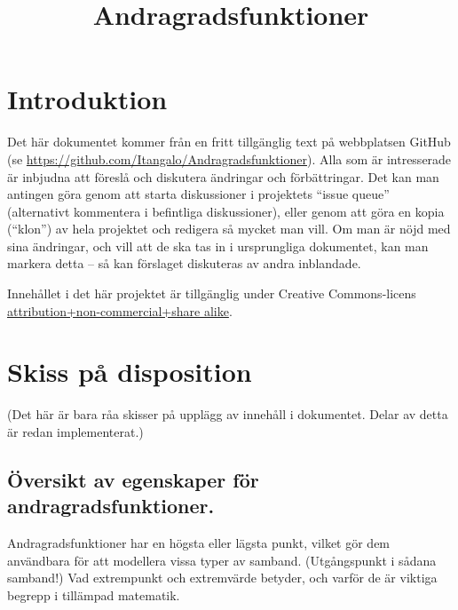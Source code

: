 \documentclass[12pt]{article}
\title{Andragradsfunktioner}
\date{}
\begin{document}
  \maketitle
  
  
  
  \section{Introduktion}
  Det här dokumentet kommer från en fritt tillgänglig text på webbplatsen GitHub (se \url{https://github.com/Itangalo/Andragradsfunktioner}).
  Alla som är intresserade är inbjudna att föreslå och diskutera ändringar och förbättringar.
  Det kan man antingen göra genom att starta diskussioner i projektets ``issue queue'' (alternativt kommentera i befintliga diskussioner), eller genom att göra en kopia (``klon'') av hela projektet och redigera så mycket man vill.
  Om man är nöjd med sina ändringar, och vill att de ska tas in i ursprungliga dokumentet, kan man markera detta -- så kan förslaget diskuteras av andra inblandade.

  Innehållet i det här projektet är tillgänglig under Creative Commons-licens \href{http://creativecommons.org/licenses/by-nc-sa/3.0/}{attribution+non-commercial+share alike}.

  
  
  

  

  

  
  
  \section{Skiss på disposition}
  
  (Det här är bara råa skisser på upplägg av innehåll i dokumentet. Delar av detta är redan implementerat.)

  \subsection{Översikt av egenskaper för andragradsfunktioner.}
  Andragradsfunktioner har en högsta eller lägsta punkt, vilket gör dem användbara för att modellera vissa typer av samband.
  (Utgångspunkt i sådana samband!)
  Vad extrempunkt och extremvärde betyder, och varför de är viktiga begrepp i tillämpad matematik.
\end{document}
